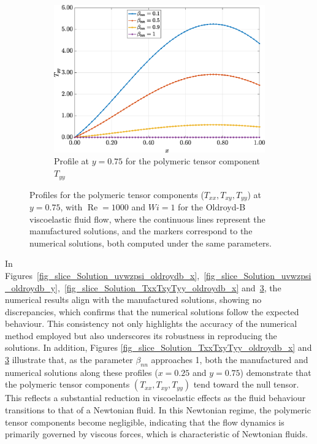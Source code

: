 \documentclass[preprint, 12pt]{elsarticle}
\begin{document}
\begin{figure}[H]
\begin{subfigure}[b]{.46\textwidth}
        \label{fig_slice_y_txy_2nd_Case1_oldorydb}
    \end{subfigure}
    \begin{subfigure}[b]{.46\textwidth}
        \includegraphics[width=\textwidth]{Slice_y_Tog_Numerical_NormErr_2nd_Betann_1_Re_1000_Wi_1_epsilon_0_xi_0_alphaG_0_Dt_1e-06_at_0.05_tipsim_1_MMS_12_x0.75y0.75_Tyy.eps}
        \caption{Profile at $y=0.75$ for the polymeric tensor component $T_{yy}$}
        \label{fig_slice_y_tyy_2nd_Case1_oldorydb}
    \end{subfigure}
    \vspace{0.02cm}
    \caption{Profiles for the polymeric tensor components ($T_{xx}, T_{xy}, T_{yy}$) at $y=0.75$, with $\operatorname{Re}=1000$ and $Wi=1$ for the Oldroyd-B viscoelastic fluid flow, where the continuous lines represent the manufactured solutions, and the markers correspond to the numerical solutions, both computed under the same parameters.\label{fig_slice_Solution_TxxTxyTyy_oldroydb_y}}
\end{figure}

In
Figures~\ref{fig_slice_Solution_uvwzpsi_oldroydb_x},~\ref{fig_slice_Solution_uvwzpsi_oldroydb_y},~\ref{fig_slice_Solution_TxxTxyTyy_oldroydb_x}
and~\ref{fig_slice_Solution_TxxTxyTyy_oldroydb_y}, the numerical results align
with the manufactured solutions, showing no discrepancies, which confirms that
the numerical solutions follow the expected behaviour. This consistency not
only highlights the accuracy of the numerical method employed but also
underscores its robustness in reproducing the solutions. In addition, Figures
\ref{fig_slice_Solution_TxxTxyTyy_oldroydb_x} and
\ref{fig_slice_Solution_TxxTxyTyy_oldroydb_y} illustrate that, as the parameter
$\beta_{nn}$ approaches 1, both the manufactured and numerical solutions along
these profiles ($x=0.25$ and $y=0.75$) demonstrate that the polymeric tensor
components $(T_{xx}, T_{xy}, T_{yy})$ tend toward the null tensor. This
reflects a substantial reduction in viscoelastic effects as the fluid behaviour
transitions to that of a Newtonian fluid. In this Newtonian regime, the
polymeric tensor components become negligible, indicating that the flow
dynamics is primarily governed by viscous forces, which is characteristic of
Newtonian fluids.
\end{document}
